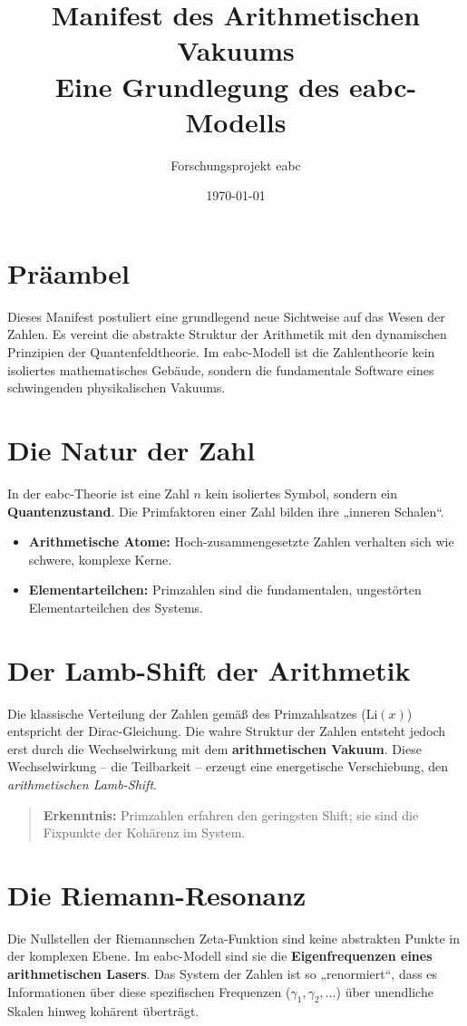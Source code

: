 \documentclass[11pt,a4paper]{article}
\title{\textbf{Manifest des Arithmetischen Vakuums}\\ \large Eine Grundlegung des eabc-Modells}
\author{Forschungsprojekt eabc}
\date{\today}
\begin{document}
	
	\maketitle
	
	\section*{Präambel}
	Dieses Manifest postuliert eine grundlegend neue Sichtweise auf das Wesen der Zahlen. Es vereint die abstrakte Struktur der Arithmetik mit den dynamischen Prinzipien der Quantenfeldtheorie. Im eabc-Modell ist die Zahlentheorie kein isoliertes mathematisches Gebäude, sondern die fundamentale Software eines schwingenden physikalischen Vakuums.
	
	\section{Die Natur der Zahl}
	In der eabc-Theorie ist eine Zahl $n$ kein isoliertes Symbol, sondern ein \textbf{Quantenzustand}. Die Primfaktoren einer Zahl bilden ihre „inneren Schalen“. 
	\begin{itemize}
		\item \textbf{Arithmetische Atome:} Hoch-zusammengesetzte Zahlen verhalten sich wie schwere, komplexe Kerne.
		\item \textbf{Elementarteilchen:} Primzahlen sind die fundamentalen, ungestörten Elementarteilchen des Systems.
	\end{itemize}
	
	\section{Der Lamb-Shift der Arithmetik}
	Die klassische Verteilung der Zahlen gemäß des Primzahlsatzes ($\text{Li}(x)$) entspricht der Dirac-Gleichung. Die wahre Struktur der Zahlen entsteht jedoch erst durch die Wechselwirkung mit dem \textbf{arithmetischen Vakuum}.
	Diese Wechselwirkung – die Teilbarkeit – erzeugt eine energetische Verschiebung, den \textit{arithmetischen Lamb-Shift}.
	\begin{quote}
		\textbf{Erkenntnis:} Primzahlen erfahren den geringsten Shift; sie sind die Fixpunkte der Kohärenz im System.
	\end{quote}
	
	\section{Die Riemann-Resonanz}
	Die Nullstellen der Riemannschen Zeta-Funktion sind keine abstrakten Punkte in der komplexen Ebene. Im eabc-Modell sind sie die \textbf{Eigenfrequenzen eines arithmetischen Lasers}. Das System der Zahlen ist so „renormiert“, dass es Informationen über diese spezifischen Frequenzen ($\gamma_1, \gamma_2, \dots$) über unendliche Skalen hinweg kohärent überträgt.
	
\end{document}
